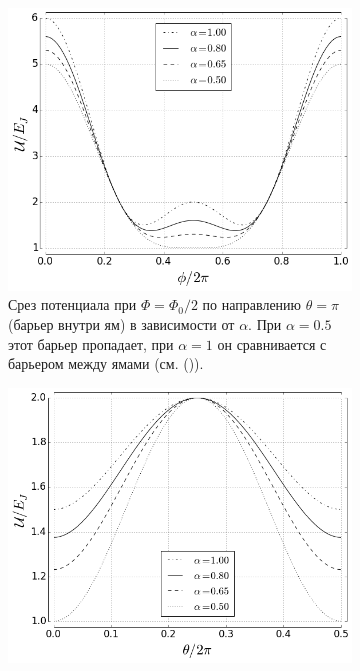 \documentclass[12pt, twoside]{report}
\numberwithin{equation}{section}
\numberwithin{figure}{section}
\begin{document}
\begin{figure}[!p]
\vspace{1cm}
\begin{subfigure}[t]{0.49\linewidth}
\centering
\includegraphics[height = 0.8\textwidth]{Pictures/qubit_potential_cut}
\caption{Срез потенциала при $\Phi = \Phi_0/2$ по направлению $\theta = \pi$ (барьер внутри ям) в зависимости от $\alpha$. При $\alpha = 0.5$ этот барьер пропадает, при $\alpha=1$ он сравнивается с барьером между ямами (см. ()).}
\label{fig:U_cut}\quad
\end{subfigure}
\begin{subfigure}[t]{0.49\linewidth}
\centering
\includegraphics[height = 0.8\textwidth]{Pictures/qubit_potential_cut2}

\end{subfigure}
\end{figure}
\end{document}
